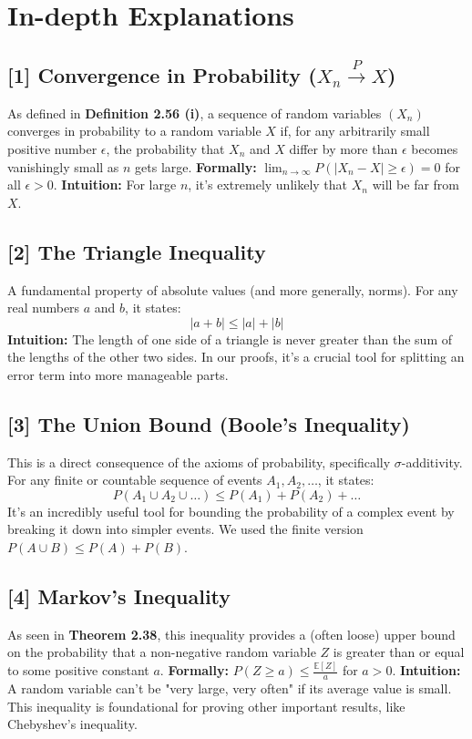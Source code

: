 \documentclass[11pt,a4paper]{article}
\theoremstyle{exercise}
\begin{document}
\section*{In-depth Explanations}
\label{sec:explanations}

\subsection*{[1] Convergence in Probability ($X_n \xrightarrow{P} X$)}
\label{note:prob-conv}
As defined in \textbf{Definition 2.56 (i)}, a sequence of random variables $(X_n)$ converges in probability to a random variable $X$ if, for any arbitrarily small positive number $\epsilon$, the probability that $X_n$ and $X$ differ by more than $\epsilon$ becomes vanishingly small as $n$ gets large.
\textbf{Formally:} $\lim_{n \to \infty} P(|X_n - X| \ge \epsilon) = 0$ for all $\epsilon > 0$.
\textbf{Intuition:} For large $n$, it's extremely unlikely that $X_n$ will be far from $X$.

\subsection*{[2] The Triangle Inequality}
\label{note:triangle}
A fundamental property of absolute values (and more generally, norms). For any real numbers $a$ and $b$, it states:
\[ |a + b| \le |a| + |b| \]
\textbf{Intuition:} The length of one side of a triangle is never greater than the sum of the lengths of the other two sides. In our proofs, it's a crucial tool for splitting an error term into more manageable parts.

\subsection*{[3] The Union Bound (Boole's Inequality)}
\label{note:union-bound}
This is a direct consequence of the axioms of probability, specifically $\sigma$-additivity. For any finite or countable sequence of events $A_1, A_2, \ldots$, it states:
\[ P(A_1 \cup A_2 \cup \ldots) \le P(A_1) + P(A_2) + \ldots \]
It's an incredibly useful tool for bounding the probability of a complex event by breaking it down into simpler events. We used the finite version $P(A \cup B) \le P(A) + P(B)$.

\subsection*{[4] Markov's Inequality}
\label{note:markov}
As seen in \textbf{Theorem 2.38}, this inequality provides a (often loose) upper bound on the probability that a non-negative random variable $Z$ is greater than or equal to some positive constant $a$.
\textbf{Formally:} $P(Z \ge a) \le \frac{\mathbb{E}[Z]}{a}$ for $a > 0$.
\textbf{Intuition:} A random variable can't be "very large, very often" if its average value is small. This inequality is foundational for proving other important results, like Chebyshev's inequality.
\end{document}
